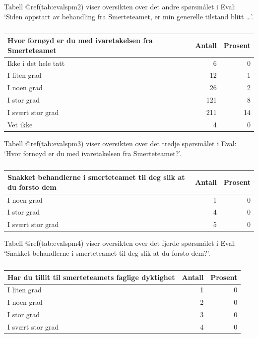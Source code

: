 \documentclass[
]{article}
\begin{document}
Tabell @ref(tab:evalspm2) viser oversikten over det andre spørsmålet i
Eval: `Siden oppstart av behandling fra Smerteteamet, er min generelle
tilstand blitt \ldots{}'.

\begin{table}

\caption{\label{tab:evalspm3}}
\centering
\begin{tabular}[t]{l|r|r}
\hline
Hvor fornøyd er du med ivaretakelsen fra Smerteteamet & Antall  & Prosent\\
\hline
Ikke i det hele tatt & 6 & 0\\
\hline
I liten grad & 12 & 1\\
\hline
I noen grad & 26 & 2\\
\hline
I stor grad & 121 & 8\\
\hline
I svært stor grad & 211 & 14\\
\hline
Vet ikke & 4 & 0\\
\hline
\end{tabular}
\end{table}

Tabell @ref(tab:evalspm3) viser oversikten over det tredje spørsmålet i
Eval: `Hvor fornøyd er du med ivaretakelsen fra Smerteteamet?'.

\begin{table}

\caption{\label{tab:evalspm4}}
\centering
\begin{tabular}[t]{l|r|r}
\hline
Snakket behandlerne i smerteteamet til deg slik at du forsto dem & Antall  & Prosent\\
\hline
I noen grad & 1 & 0\\
\hline
I stor grad & 4 & 0\\
\hline
I svært stor grad & 5 & 0\\
\hline
\end{tabular}
\end{table}

Tabell @ref(tab:evalspm4) viser oversikten over det fjerde spørsmålet i
Eval: `Snakket behandlerne i smerteteamet til deg slik at du forsto
dem?'.

\begin{table}

\caption{\label{tab:evalspm5}}
\centering
\begin{tabular}[t]{l|r|r}
\hline
Har du tillit til smerteteamets faglige dyktighet & Antall  & Prosent\\
\hline
I liten grad & 1 & 0\\
\hline
I noen grad & 2 & 0\\
\hline
I stor grad & 3 & 0\\
\hline
I svært stor grad & 4 & 0\\
\hline
\end{tabular}
\end{table}
\end{document}
